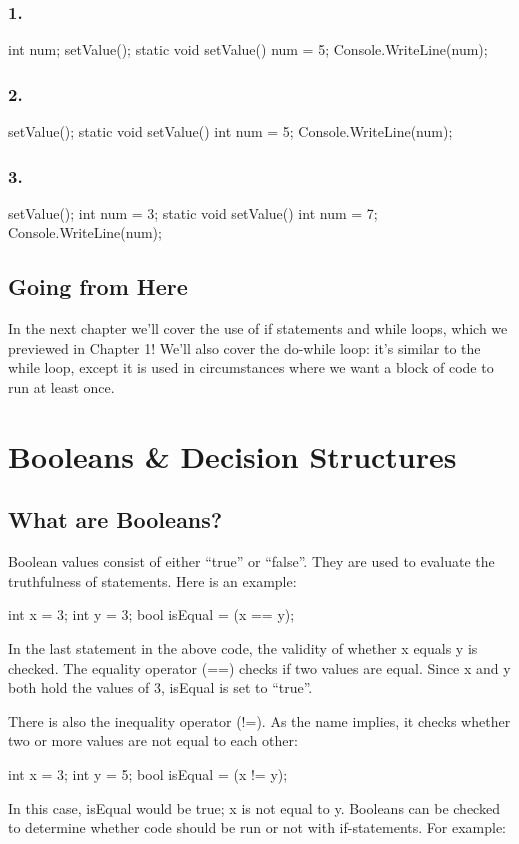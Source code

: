 \documentclass[oneside, openany] {book}
\begin{document}
\subsection*{1.}
\begin{CSharp}
int num;
setValue();
static void setValue()
{
    num = 5;
}
Console.WriteLine(num);
\end{CSharp}
\subsection*{2.}
\begin{CSharp}
setValue();
static void setValue()
{
    int num = 5;
}
Console.WriteLine(num);
\end{CSharp}
\subsection*{3.}
\begin{CSharp}
setValue();
int num = 3;
static void setValue()
{
int num = 7;
}
Console.WriteLine(num);
\end{CSharp}
\section*{Going from Here}
In the next chapter we'll cover the use of if statements and while loops, which we previewed in Chapter 1! We'll also cover the do-while loop: it's similar to the while loop, except it is used in circumstances where we want a block of code to run at least once.
\chapter{Booleans \& Decision Structures}
\minitoc
\section{What are Booleans?}
Boolean values consist of either “true” or “false”. They are used to evaluate the truthfulness of statements. Here is an example:
\begin{CSharp}
int x = 3;
int y = 3;
bool isEqual = (x == y);


\end{CSharp}
\index{==}
In the last statement in the above code, the validity of whether x equals y is checked. The equality operator (==) checks if two values are equal. Since x and y both hold the values of 3, isEqual is set to “true”.

\index{!=}
There is also the inequality operator (!=). As the name implies, it checks whether two or more values are not equal to each other:
\begin{CSharp}
int x = 3;
int y = 5;
bool isEqual = (x != y);
\end{CSharp}
In this case, isEqual would be true; x is not equal to y.
Booleans can be checked to determine whether code should be run or not with if-statements. For example:
\end{document}
